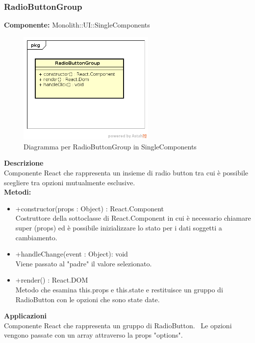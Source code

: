 \clearpage

\subsubsection{RadioButtonGroup}
\textbf{Componente:}  Monolith::UI::SingleComponents\\
   \FloatBarrier
   \begin{figure}[ht]
   \centering
   \includegraphics[width=0.6\textwidth]{img/single-RadioButtonGroup}
   \caption{{Diagramma per RadioButtonGroup in SingleComponents}}
\end{figure}
\FloatBarrier
\textbf{Descrizione}\\
Componente React che rappresenta un insieme di radio button tra cui è possibile scegliere tra opzioni mutualmente esclusive.\\

\textbf{Metodi:} 
\begin{itemize}
\item +constructor(props : Object) : React.Component 
\\
Costruttore della sottoclasse di React.Component in cui è necessario chiamare super (props) ed è possibile inizializzare lo stato per i dati soggetti a cambiamento.

\item +handleChange(event : Object): void 
\\
Viene passato al "padre" il valore selezionato.

\item +render() : React.DOM 
\\
Metodo che esamina this.props e this.state e restituisce un gruppo di RadioButton con le opzioni che sono state date.

\end{itemize} 


\textbf{Applicazioni}\\
Componente React che rappresenta un gruppo di RadioButton. \ Le opzioni vengono passate con un array attraverso la props "options". 


